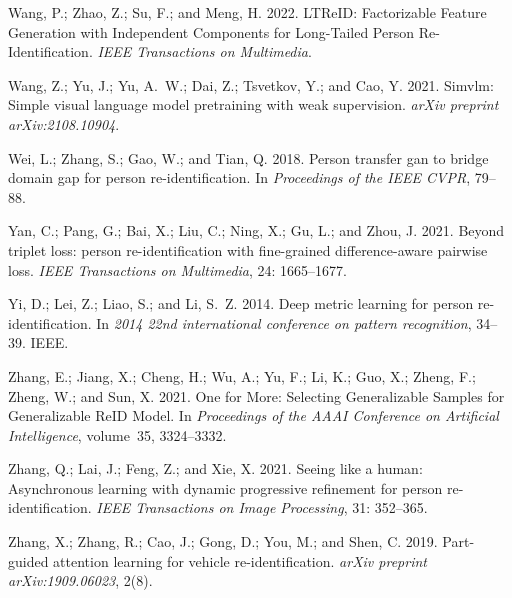 \documentclass[letterpaper]{article} \usepackage{aaai23}  \usepackage{times}  \usepackage{helvet}  \usepackage{courier}  \usepackage[hyphens]{url}  \usepackage{graphicx} \urlstyle{rm} \def\UrlFont{\rm}  \usepackage{natbib}  \usepackage{caption} \frenchspacing  \setlength{\pdfpagewidth}{8.5in}  \setlength{\pdfpageheight}{11in}  \usepackage{algorithm}
\begin{document}
\begin{small}
\begin{thebibliography}{65}
Wang, P.; Zhao, Z.; Su, F.; and Meng, H. 2022.
\newblock LTReID: Factorizable Feature Generation with Independent Components
  for Long-Tailed Person Re-Identification.
\newblock \emph{IEEE Transactions on Multimedia}.

Wang, Z.; Yu, J.; Yu, A.~W.; Dai, Z.; Tsvetkov, Y.; and Cao, Y. 2021.
\newblock Simvlm: Simple visual language model pretraining with weak
  supervision.
\newblock \emph{arXiv preprint arXiv:2108.10904}.

Wei, L.; Zhang, S.; Gao, W.; and Tian, Q. 2018.
\newblock Person transfer gan to bridge domain gap for person
  re-identification.
\newblock In \emph{Proceedings of the IEEE CVPR}, 79--88.

Yan, C.; Pang, G.; Bai, X.; Liu, C.; Ning, X.; Gu, L.; and Zhou, J. 2021.
\newblock Beyond triplet loss: person re-identification with fine-grained
  difference-aware pairwise loss.
\newblock \emph{IEEE Transactions on Multimedia}, 24: 1665--1677.

Yi, D.; Lei, Z.; Liao, S.; and Li, S.~Z. 2014.
\newblock Deep metric learning for person re-identification.
\newblock In \emph{2014 22nd international conference on pattern recognition},
  34--39. IEEE.

Zhang, E.; Jiang, X.; Cheng, H.; Wu, A.; Yu, F.; Li, K.; Guo, X.; Zheng, F.;
  Zheng, W.; and Sun, X. 2021{}.
\newblock One for More: Selecting Generalizable Samples for Generalizable ReID
  Model.
\newblock In \emph{Proceedings of the AAAI Conference on Artificial
  Intelligence}, volume~35, 3324--3332.

Zhang, Q.; Lai, J.; Feng, Z.; and Xie, X. 2021{}.
\newblock Seeing like a human: Asynchronous learning with dynamic progressive
  refinement for person re-identification.
\newblock \emph{IEEE Transactions on Image Processing}, 31: 352--365.

Zhang, X.; Zhang, R.; Cao, J.; Gong, D.; You, M.; and Shen, C. 2019.
\newblock Part-guided attention learning for vehicle re-identification.
\newblock \emph{arXiv preprint arXiv:1909.06023}, 2(8).


\end{thebibliography}
\end{small}
\end{document}
